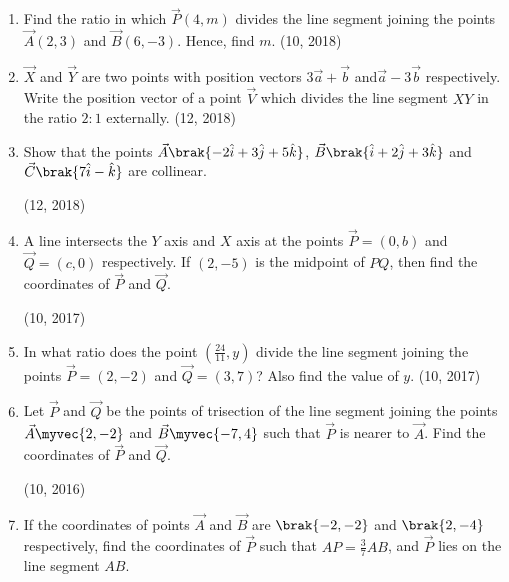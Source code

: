 \begin{enumerate}[label=\thesubsection.\arabic*,ref=\thesubsection.\theenumi]
    \item Find the ratio in which $\vec{P}(4,m)$ divides the line segment joining the points $\vec{A}(2,3)$ and $\vec{B}(6,-3)$. Hence, find $m$. \hfill (10, 2018)
\item $\vec{X}$ and $\vec{Y}$ are two points with position vectors $3\overrightarrow{a}+\overrightarrow{b}$ and$\overrightarrow{a}-3\overrightarrow{b}$ respectively. Write the position vector of a point $\vec{V}$ which divides the line segment $XY$ in the ratio $2:1$ externally.
\hfill (12, 2018) 
\item Show that the points $\vec{A}\brak{-2\hat{i} + 3\hat{j} + 5\hat{k}}$, $\vec{B}\brak{\hat{i} + 2\hat{j} + 3\hat{k}}$ and $\vec{C}\brak{7\hat{i} -\hat{k} }$ are collinear.

\hfill (12, 2018) 
\item A line intersects the $Y$ axis and $X$ axis at the points $\vec{P} = (0, b)$ and $\vec{Q} = (c, 0)$ respectively. If $(2, -5)$ is the midpoint of $PQ$, then find the coordinates of $\vec{P}$ and $\vec{Q}$.

	\hfill (10, 2017)
\item In what ratio does the point $\left(\frac{24}{11}, y\right)$ divide the line segment joining the points $\vec{P} = (2, -2)$ and $\vec{Q} = (3, 7)$? Also find the value of $y$. \hfill (10, 2017)
    \item Let $\vec{P}$ and $\vec{Q}$ be the points of trisection of the line segment joining the points $\vec{A} \myvec{2,-2}$ and $\vec{B} \myvec{-7, 4}$ such that $\vec{P}$ is nearer to $\vec{A}$. Find the coordinates of $\vec{P}$ and $\vec{Q}$.
	    
	    \hfill (10, 2016)
    \item If the coordinates of points $\vec{A}$ and $\vec{B}$ are $\brak{-2, -2}$ and $\brak{2, -4}$ respectively, find the coordinates of $\vec{P}$ such that $AP = \frac{3}{7} AB$, and $\vec{P}$ lies on the line segment $AB$. 


\end{enumerate}
